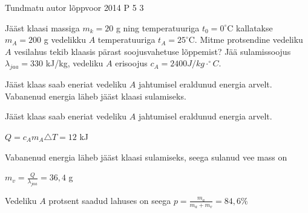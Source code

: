 {Tundmatu autor} %
{lõppvoor} %
{2014} %
{P 5} %
{3} %
{

\ifStatement
Jääst klaasi massiga $m_k = 20$ g ning temperatuuriga $t_0 = 0^{\circ}$C kallatakse $m_A=200$ g vedelikku $A$ temperatuuriga  $t_A = 25^{\circ}$C. Mitme protsendine vedeliku $A$ vesilahus tekib klaasis pärast soojusvahetuse lõppemist? Jää sulamissoojus $\lambda_{jaa} = 330$ kJ/kg, vedeliku $A$ erisoojus $c_A = 2400 J/kg \cdot ^{\circ}C$.
\fi

\ifHint
Jääst klaas saab eneriat vedeliku $A$ jahtumisel eraldunud energia arvelt. Vabanenud energia läheb jääst klaasi sulamiseks.
\fi

\ifSolution
Jääst klaas saab eneriat vedeliku $A$ jahtumisel eraldunud energia arvelt.
\begin{center}
$Q = c_A m_A \triangle T = 12$ kJ
\end{center}
Vabanenud energia läheb jääst klaasi sulamiseks, seega sulanud vee mass on
\begin{center}
$m_v = \frac{Q}{\lambda_{jaa}} = 36,4$ g
\end{center}
Vedeliku $A$ protsent saadud lahuses on seega $p = \frac{m_a}{m_a + m_v} = 84,6 \%$
\fi
}